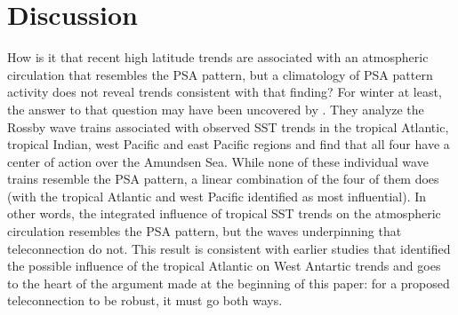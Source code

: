 \section{Discussion}

How is it that recent high latitude trends are associated with an atmospheric circulation that resembles the PSA pattern, but a climatology of PSA pattern activity does not reveal trends consistent with that finding? For winter at least, the answer to that question may have been uncovered by \citet{Li2015a}. They analyze the Rossby wave trains associated with observed SST trends in the tropical Atlantic, tropical Indian, west Pacific and east Pacific regions and find that all four have a center of action over the Amundsen Sea. While none of these individual wave trains resemble the PSA pattern, a linear combination of the four of them does (with the tropical Atlantic and west Pacific identified as most influential). In other words, the integrated influence of tropical SST trends on the atmospheric circulation resembles the PSA pattern, but the waves underpinning that teleconnection do not. This result is consistent with earlier studies that identified the possible influence of the tropical Atlantic on West Antartic trends \citep{Li2014,Simpkins2014} and goes to the heart of the argument made at the beginning of this paper: for a proposed teleconnection to be robust, it must go both ways. 
